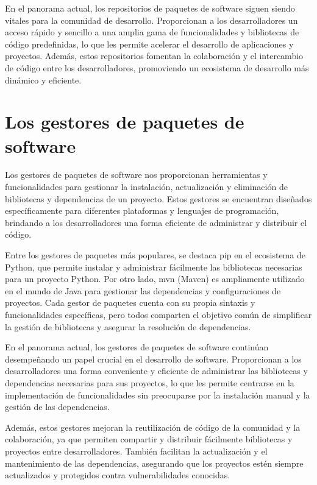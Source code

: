 En el panorama actual, los repositorios de paquetes de software siguen siendo vitales para la comunidad de desarrollo. Proporcionan a los desarrolladores un acceso rápido y sencillo a una amplia gama de funcionalidades y bibliotecas de código predefinidas, lo que les permite acelerar el desarrollo de aplicaciones y proyectos. Además, estos repositorios fomentan la colaboración y el intercambio de código entre los desarrolladores, promoviendo un ecosistema de desarrollo más dinámico y eficiente.

\section{Los gestores de paquetes de software}

Los gestores de paquetes de software nos proporcionan herramientas y funcionalidades para gestionar la instalación, actualización y eliminación de bibliotecas y dependencias de un proyecto. Estos gestores se encuentran diseñados específicamente para diferentes plataformas y lenguajes de programación, brindando a los desarrolladores una forma eficiente de administrar y distribuir el código.

Entre los gestores de paquetes más populares, se destaca pip en el ecosistema de Python, que permite instalar y administrar fácilmente las bibliotecas necesarias para un proyecto Python. Por otro lado, mvn (Maven) es ampliamente utilizado en el mundo de Java para gestionar las dependencias y configuraciones de proyectos. Cada gestor de paquetes cuenta con su propia sintaxis y funcionalidades específicas, pero todos comparten el objetivo común de simplificar la gestión de bibliotecas y asegurar la resolución de dependencias.

En el panorama actual, los gestores de paquetes de software continúan desempeñando un papel crucial en el desarrollo de software. Proporcionan a los desarrolladores una forma conveniente y eficiente de administrar las bibliotecas y dependencias necesarias para sus proyectos, lo que les permite centrarse en la implementación de funcionalidades sin preocuparse por la instalación manual y la gestión de las dependencias.

Además, estos gestores mejoran la reutilización de código de la comunidad y la colaboración, ya que permiten compartir y distribuir fácilmente bibliotecas y proyectos entre desarrolladores. También facilitan la actualización y el mantenimiento de las dependencias, asegurando que los proyectos estén siempre actualizados y protegidos contra vulnerabilidades conocidas.

